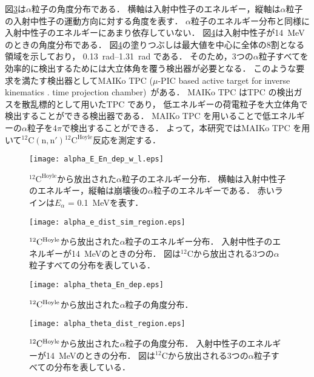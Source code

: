 \documentclass[../master]{subfiles}
\begin{document}
図\ref{fig::alpha_theta_En_dep}は$\alpha$粒子の角度分布である．
横軸は入射中性子のエネルギー，縦軸は$\alpha$粒子の入射中性子の運動方向に対する角度を表す．
$\alpha$粒子のエネルギー分布と同様に入射中性子のエネルギーにあまり依存していない．
図\ref{fig::alpha_theta_dist}は入射中性子が\SI{14}{\mega\electronvolt}のときの角度分布である．
図\ref{fig::alpha_theta_dist}の塗りつぶしは最大値を中心に全体の8割となる領域を示しており，
\SIrange{0.13}{1.31}{\radian} である．
そのため，3つの$\alpha$粒子すべてを効率的に検出するためには大立体角を覆う検出器が必要となる．
このような要求を満たす検出器としてMAIKo TPC ($\mu$-PIC based active target for inverse kinematics .
time projection chamber)~\cite{maiko, mupic}がある．
MAIKo TPC はTPC の検出ガスを散乱標的として用いたTPC であり，
低エネルギーの荷電粒子を大立体角で検出することができる検出器である．
MAIKo TPC を用いることで低エネルギーの$\alpha$粒子を4$\pi$で検出することができる．
よって，本研究ではMAIKo TPC を用いて${}^{12}\mathrm{C}(\mathrm{n},\mathrm{n}'){}^{12}\mathrm{C}^{\text{Hoyle}}$反応を測定する．
\begin{figure}
  \centering
  \texttt{[image: alpha\_E\_En\_dep\_w\_l.eps]}
  \caption{${}^{12}\mathrm{C}^{\text{Hoyle}}$から放出された$\alpha$粒子のエネルギー分布．
    横軸は入射中性子のエネルギー，縦軸は崩壊後の$\alpha$粒子のエネルギーである．
    赤いラインは$E_{\alpha}$ = \SI{0.1}{\mega\electronvolt}を表す．
  }
  \label{fig::alpha_E_En_dep_w_l}
\end{figure}
\begin{figure}
  \centering
  \texttt{[image: alpha\_e\_dist\_sim\_region.eps]}
  \caption[${}^{12}{\rm C}^{\text{Hoyle}}$から放出された$\alpha$粒子のエネルギー分布．]
          {${}^{12}{\rm C}^{\text{Hoyle}}$から放出された$\alpha$粒子のエネルギー分布．
            入射中性子のエネルギーが\SI{14}{\mega\electronvolt}のときの分布．
            図は${}^{12}\mathrm{C}$から放出される3つの$\alpha$粒子すべての分布を表している．}
          \label{fig::alpha_E_dist}
\end{figure}
\begin{figure}
  \centering
  \texttt{[image: alpha\_theta\_En\_dep.eps]}
  \caption{${}^{12}{\rm C}^{\text{Hoyle}}$から放出された$\alpha$粒子の角度分布．}
  \label{fig::alpha_theta_En_dep}
\end{figure}
\begin{figure}
  \centering
  \texttt{[image: alpha\_theta\_dist\_region.eps]}
  \caption[${}^{12}{\rm C}^{\text{Hoyle}}$から放出された$\alpha$粒子の角度分布．]
          {${}^{12}{\rm C}^{\text{Hoyle}}$から放出された$\alpha$粒子の角度分布．
            入射中性子のエネルギーが\SI{14}{\mega\electronvolt}のときの分布．
            図は${}^{12}\mathrm{C}$から放出される3つの$\alpha$粒子すべての分布を表している．
          }
  \label{fig::alpha_theta_dist}
\end{figure}
\end{document}
